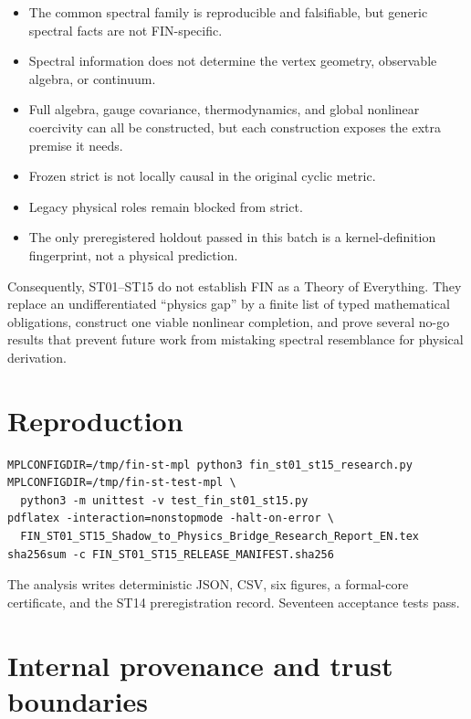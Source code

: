 \documentclass[11pt,a4paper]{article}
\begin{document}
\begin{itemize}
\item The common spectral family is reproducible and falsifiable, but generic spectral facts are not FIN-specific.
\item Spectral information does not determine the vertex geometry, observable algebra, or continuum.
\item Full algebra, gauge covariance, thermodynamics, and global nonlinear coercivity can all be constructed, but each construction exposes the extra premise it needs.
\item Frozen strict is not locally causal in the original cyclic metric.
\item Legacy physical roles remain blocked from strict.
\item The only preregistered holdout passed in this batch is a kernel-definition fingerprint, not a physical prediction.
\end{itemize}

Consequently, ST01--ST15 do not establish FIN as a Theory of Everything. They replace an undifferentiated ``physics gap'' by a finite list of typed mathematical obligations, construct one viable nonlinear completion, and prove several no-go results that prevent future work from mistaking spectral resemblance for physical derivation.

\appendix
\section{Reproduction}

\begin{verbatim}
MPLCONFIGDIR=/tmp/fin-st-mpl python3 fin_st01_st15_research.py
MPLCONFIGDIR=/tmp/fin-st-test-mpl \
  python3 -m unittest -v test_fin_st01_st15.py
pdflatex -interaction=nonstopmode -halt-on-error \
  FIN_ST01_ST15_Shadow_to_Physics_Bridge_Research_Report_EN.tex
sha256sum -c FIN_ST01_ST15_RELEASE_MANIFEST.sha256
\end{verbatim}

The analysis writes deterministic JSON, CSV, six figures, a formal-core certificate, and the ST14 preregistration record. Seventeen acceptance tests pass.

\section{Internal provenance and trust boundaries}
\end{document}
